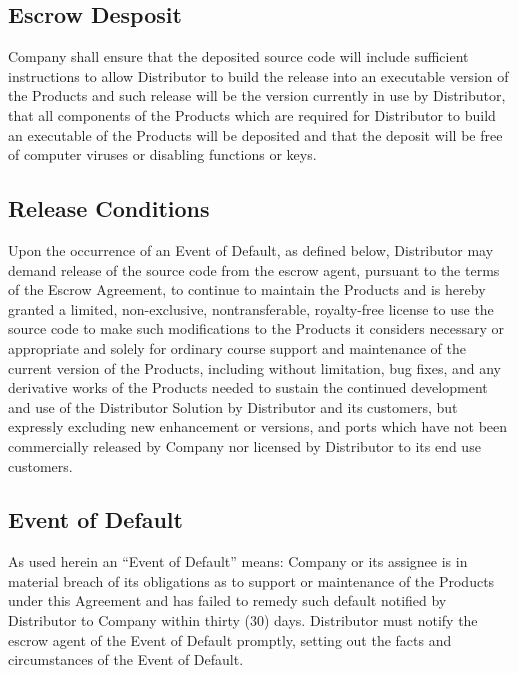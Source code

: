 \documentclass[letterpaper,10pt,openany,oneside,english]{sphinxmanual}
\begin{document}
\subsection{Escrow Desposit}
\label{\detokenize{escrow:escrow-desposit}}
Company shall ensure that the deposited source code will include sufficient instructions to allow Distributor to build the release into an executable version of the Products and such release will be the version currently in use by Distributor, that all components of the Products which are required for Distributor to build an executable of the Products will be deposited and that the deposit will be free of computer viruses or disabling functions or keys.


\subsection{Release Conditions}
\label{\detokenize{escrow:release-conditions}}
Upon the occurrence of an Event of Default, as defined below, Distributor may demand release of the source code from the escrow agent, pursuant to the terms of the Escrow Agreement, to continue to maintain the Products and is hereby granted a limited, non-exclusive, nontransferable, royalty-free license to use the source code to make such modifications to the Products it considers necessary or appropriate and solely for ordinary course support and maintenance of the current version of the Products, including without limitation, bug fixes, and any derivative works of the Products needed to sustain the continued development and use of the Distributor Solution by Distributor and its customers, but expressly excluding new enhancement or versions,  and ports which have not been commercially released by Company nor licensed by Distributor to its end use customers.


\subsection{Event of Default}
\label{\detokenize{escrow:event-of-default}}
As used herein an “Event of Default” means: Company or its assignee is in material breach of its obligations as to support or maintenance of the Products under this Agreement and has failed to remedy such default notified by Distributor to Company within thirty (30) days.  Distributor must notify the escrow agent of the Event of Default promptly, setting out the facts and circumstances of the Event of Default.
\end{document}
